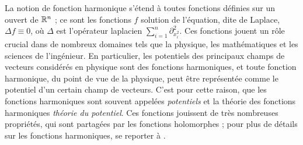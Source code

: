 La notion de fonction harmonique s'étend à toutes fonctions définies sur un ouvert de $\mathbb R^n$ ; ce sont les fonctions $f$ solution de l'équation, dite de Laplace, $\Delta f \equiv 0$, où $\Delta$ est l'opérateur laplacien $\sum_{i=1}^n \partial^2_{x_i^2}$. Ces fonctions jouent un rôle crucial dans de nombreux domaines tels que la physique, les mathématiques et les sciences de l'ingénieur. En particulier, les potentiels des principaux champs de vecteurs considérés en physique sont des fonctions harmoniques, et toute fonction harmonique, du point de vue de la physique, peut être représentée comme le potentiel d'un certain champ de vecteurs. C'est pour cette raison, que les fonctions harmoniques sont souvent appelées \textit{potentiels} et la théorie des fonctions harmoniques \textit{théorie du potentiel}. Ces fonctions jouissent de très nombreuses propriétés, qui sont partagées par les fonctions holomorphes ; pour plus de détails sur les fonctions harmoniques, se reporter à \cite{axler2013harmonic, rudin1988analyse}.

%
%
\vspace*{1cm}

